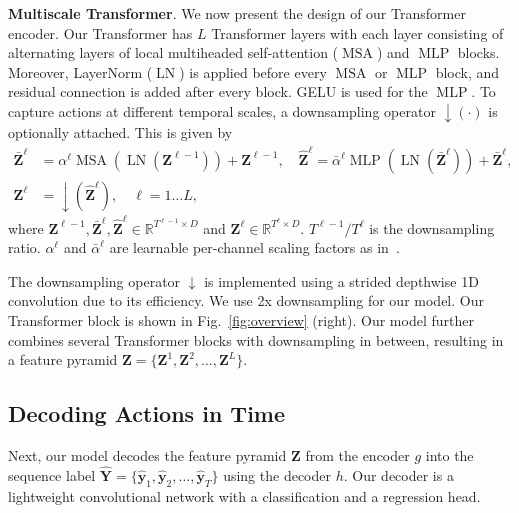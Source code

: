 \smallskip
\noindent \textbf{Multiscale Transformer}. We now present the design of our Transformer encoder. Our Transformer has $L$ Transformer layers with each layer consisting of alternating layers of local multiheaded self-attention ($\operatorname{MSA}$) and $\operatorname{MLP}$ blocks. Moreover, LayerNorm ($\operatorname{LN}$) is applied before every $\operatorname{MSA}$ or $\operatorname{MLP}$ block, and residual connection is added after every block. GELU is used for the $\operatorname{MLP}$. To capture actions at different temporal scales, a downsampling operator $\operatorname{\downarrow}(\cdot)$ is optionally attached. This is given by
\begin{equation}
\begin{split}
    \mathbf{\bar{Z}}^\ell &= \alpha^\ell \operatorname{MSA}(\operatorname{LN}(\mathbf{Z}^{\ell-1})) + \mathbf{Z}^{\ell-1}, \quad
    \mathbf{\hat{Z}}^\ell = \bar{\alpha}^\ell\operatorname{MLP}(\operatorname{LN}(\mathbf{\bar{Z}}^{\ell})) + \mathbf{\bar{Z}}^{\ell}, \\
    \mathbf{Z}^\ell &= \operatorname{\downarrow}(\mathbf{\hat{Z}}^{\ell}), \quad \ell=1\ldots L, 
\end{split}
\end{equation}%
where $\mathbf{Z}^{\ell-1}, \mathbf{\bar{Z}}^{\ell}, \mathbf{\hat{Z}}^{\ell}\in \mathbb{R}^{T^{\ell-1} \times D}$ and $\mathbf{Z}^\ell \in \mathbb{R}^{T^{\ell} \times D}$. $T^{\ell-1} / T^{\ell}$ is the downsampling ratio. $\alpha^\ell$ and $\bar{\alpha}^\ell$ are learnable per-channel scaling factors as in~\cite{touvron2021going}.

The downsampling operator $\operatorname{\downarrow}$ is implemented using a strided depthwise 1D convolution due to its efficiency. We use 2x downsampling for our model. Our Transformer block is shown in Fig.\ \ref{fig:overview} (right). Our model further combines several Transformer blocks with downsampling in between, resulting in a feature pyramid $\mathbf{Z}=\{\mathbf{Z}^1, \mathbf{Z}^2, \ldots, \mathbf{Z}^L\}$.

\subsection{Decoding Actions in Time}\label{sec:method:decoder}
Next, our model decodes the feature pyramid $\mathbf{Z}$ from the encoder $g$ into the sequence label $\mathbf{\hat{Y}}=\{\mathbf{\hat{y}}_1, \mathbf{\hat{y}}_2, \ldots, \mathbf{\hat{y}}_T\}$ using the decoder $h$. Our decoder is a lightweight convolutional network with a classification and a regression head. 

